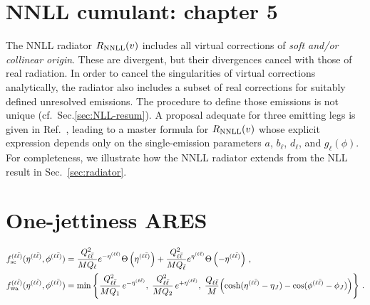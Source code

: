 \section{NNLL cumulant: chapter 5}
The NNLL radiator $R_{\rm NNLL}(v)$ includes all virtual
  corrections of \emph{soft and/or collinear origin}. These are divergent,
  but their divergences cancel with those of real radiation. In
  order to cancel the singularities of virtual corrections analytically, the
  radiator also includes a subset of real corrections for suitably
  defined unresolved emissions. The procedure to define those
  emissions is not unique (cf.\ Sec.\ref{sec:NLL-resum}). 
  A proposal adequate for three emitting legs is given in
  Ref.~\cite{Arpino:2019ozn}, leading to a master formula for
  $R_{\rm NNLL}(v)$ whose explicit expression depends only on the
  single-emission parameters $a$, $b_\ell$, $d_\ell$, and
  $g_\ell(\phi)$. For completeness, we illustrate how
  the NNLL radiator extends from the NLL result in
  Sec.~\ref{sec:radiator}. 

\section{One-jettiness ARES}
\begin{equation}
\begin{aligned}
	&f_{\rm sc}^{(\ell\bar\ell)}(\eta^{(\ell\bar\ell)},\phi^{(\ell\bar\ell)})=\frac{Q_{\ell\bar\ell}^2}{MQ_{\ell}}e^{-\eta^{(\ell\bar\ell)}}\Theta\left(\eta^{(\ell\bar\ell)}\right)+\frac{Q_{\ell\bar\ell}^2}{MQ_{\bar\ell}}e^{\eta^{(\ell\bar\ell)}}\Theta\left(-\eta^{(\ell\bar\ell)}\right)\,,\\
	&f_{\rm wa}^{(\ell\bar\ell)}(\eta^{(\ell\bar\ell)},\phi^{(\ell\bar\ell)}) =
\min\left\{
\frac{Q_{\ell\bar\ell}^2}{MQ_1}\,e^{-\eta^{(\ell\bar\ell)}},\;
\frac{Q_{\ell\bar\ell}^2}{MQ_2}\,e^{+\eta^{(\ell\bar\ell)}},\;
\frac{Q_{\ell\bar\ell}}{M}\!\left(\cosh(\eta^{(\ell\bar\ell)}-\eta_J)
-\cos(\phi^{(\ell\bar\ell)}-\phi_J)\right)
\right\}\,.
\end{aligned}
\end{equation}


